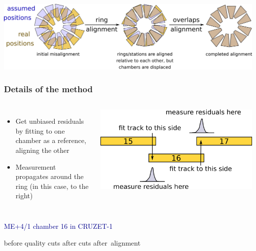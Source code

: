 \documentclass[compress]{beamer}
\begin{document}
\begin{frame}
\vfill
\vfill
\includegraphics[width=\linewidth]{two_step_procedure.png}
\end{frame}

\vspace{0.2 cm}
\begin{frame}
\frametitle{Details of the method}

\begin{columns}
{\small
\begin{itemize}
\item Get unbiased residuals by fitting to one chamber as a reference, aligning the other
\item Measurement propagates around the ring (in this case, to the right)
\end{itemize}
}

\includegraphics[width=\linewidth]{fit_to_both.png}
\end{columns}

\vspace{0.5 cm}
\hspace{-0.83 cm} \textcolor{darkblue}{\Large ME+4/1 chamber 16 in CRUZET-1}

\vspace{0.1 cm}
\hspace{0.9 cm} before quality cuts \hspace{1.7 cm} after cuts \hspace{1 cm} \mbox{after alignment\hspace{-1 cm}}


\end{frame}
\end{document}
